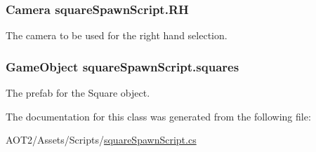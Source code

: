 \subsubsection[{R\+H}]{\setlength{\rightskip}{0pt plus 5cm}Camera square\+Spawn\+Script.\+R\+H}\label{classsquare_spawn_script_acc39770a5d684a4b5e1057b832dc979d}
The camera to be used for the right hand selection. \hypertarget{classsquare_spawn_script_a353637659973cde399b46b194b30eb2e}{}
\subsubsection[{squares}]{\setlength{\rightskip}{0pt plus 5cm}Game\+Object square\+Spawn\+Script.\+squares}\label{classsquare_spawn_script_a353637659973cde399b46b194b30eb2e}
The prefab for the Square object. 

The documentation for this class was generated from the following file\+:\begin{DoxyCompactItemize}
\item 
A\+O\+T2/\+Assets/\+Scripts/\hyperlink{square_spawn_script_8cs}{square\+Spawn\+Script.\+cs}\end{DoxyCompactItemize}
